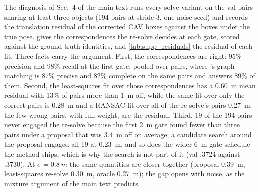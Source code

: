 The diagnosis of Sec.~4 of the main text runs every solve variant on the \vxreal val pairs sharing at least three objects (194 pairs at stride 3, one noise seed) and records the translation residual of the corrected CAV boxes against the boxes under the true pose.  gives the correspondences the re-solve decides at each gate, scored against the ground-truth identities, and \cref{tab:supp_residuals} the residual of each fit. Three facts carry the argument. First, the correspondences are right: 95\% precision and 98\% recall at the first gate, pooled over pairs, where \freealign's graph matching is 87\% precise and 82\% complete on the same pairs and answers 89\% of them. Second, the least-squares fit over those correspondences has a \SI{0.60}{m} mean residual with 13\% of pairs more than \SI{1}{m} off, while the same fit over only the correct pairs is \SI{0.28}{m} and a RANSAC fit over all of the re-solve's pairs \SI{0.27}{m}: the few wrong pairs, with full weight, are the residual. Third, 19 of the 194 pairs never engaged the re-solve because the first \SI{2}{m} gate found fewer than three pairs under a proposal that was \SI{3.4}{m} off on average; a candidate search around the proposal engaged all 19 at \SI{0.23}{m}, and so does the wider \SI{6}{m} gate schedule the method ships, which is why the search is not part of it (val  .3724 against .3730). At $\sigma=\SI{0.8}{m}$ the same quantities are closer together (proposal \SI{0.39}{m}, least-squares re-solve \SI{0.30}{m}, oracle \SI{0.27}{m}); the gap opens with noise, as the mixture argument of the main text predicts.

\begin{table}[t]
  \centering\small
  \caption{\textbf{Correspondences of the re-solve by gate}, dense \vxreal val pairs at $\sigma{=}\SI{2}{m}$: precision pooled over pairs, mean recall, mean pairs per stage; \freealign's matching on the same pairs. Source: \texttt{dense\_resolve\_diagnosis\_val\_result.json}.}
  \label{tab:supp_stages}
\end{table}

